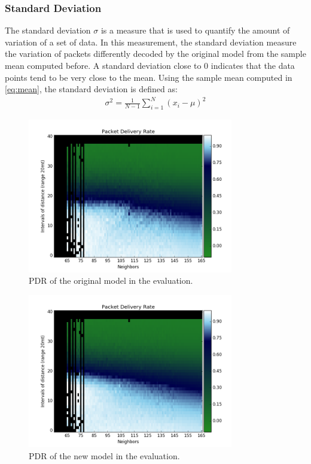 \subsubsection{Standard Deviation}
The standard deviation $\sigma$ is a measure that is used to quantify the amount of variation of a set of data. In this measurement, the standard deviation measure the variation of packets differently decoded by the original model from the sample mean computed before. A standard deviation close to 0 indicates that the data points tend to be very close to the mean. Using the sample mean computed in \eqref{eq:mean}, the standard deviation is defined as:
\begin{gather}
    \sigma^2=\frac{1}{N-1}\sum\limits_{i=1}^N \left(x_i - \mu\right)^2
\end{gather}
\newpage
\begin{figure}[H]
    \centering
    \includegraphics[width=0.8\textwidth]{fig/Original_test_640_plot.png}
    \caption{PDR of the original model in the evaluation.}
    \label{fig:pdro}
\end{figure}
\begin{figure}[H]
    \centering
    \includegraphics[width=0.8\textwidth]{fig/Markov_test_640_plot.png}
    \caption{PDR of the new model in the evaluation.}
    \label{fig:pdrn}
\end{figure}
\newpage
